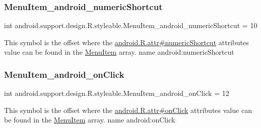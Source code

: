 \subsubsection{\texorpdfstring{Menu\+Item\+\_\+android\+\_\+numeric\+Shortcut}{MenuItem\_android\_numericShortcut}}
{\footnotesize\ttfamily int android.\+support.\+design.\+R.\+styleable.\+Menu\+Item\+\_\+android\+\_\+numeric\+Shortcut = 10\hspace{0.3cm}{\ttfamily [static]}}

This symbol is the offset where the \hyperlink{}{android.\+R.\+attr\#numeric\+Shortcut} attribute\textquotesingle{}s value can be found in the \hyperlink{classandroid_1_1support_1_1design_1_1R_1_1styleable_a4c90afdbb461f2bfba191da26fbc881c}{Menu\+Item} array.  name android\+:numeric\+Shortcut \mbox{\label{classandroid_1_1support_1_1design_1_1R_1_1styleable_a9484e64b62aa88502a3a5c401944589e}} 
\subsubsection{\texorpdfstring{Menu\+Item\+\_\+android\+\_\+on\+Click}{MenuItem\_android\_onClick}}
{\footnotesize\ttfamily int android.\+support.\+design.\+R.\+styleable.\+Menu\+Item\+\_\+android\+\_\+on\+Click = 12\hspace{0.3cm}{\ttfamily [static]}}

This symbol is the offset where the \hyperlink{}{android.\+R.\+attr\#on\+Click} attribute\textquotesingle{}s value can be found in the \hyperlink{classandroid_1_1support_1_1design_1_1R_1_1styleable_a4c90afdbb461f2bfba191da26fbc881c}{Menu\+Item} array.  name android\+:on\+Click \mbox{\label{classandroid_1_1support_1_1design_1_1R_1_1styleable_a63a7fd821acd701fe9d619cd623638b6}} 
